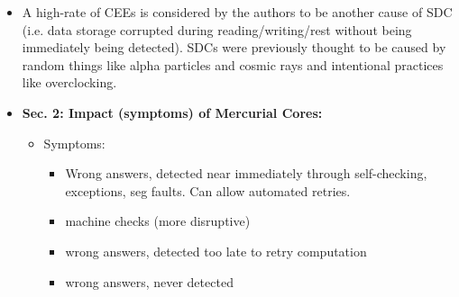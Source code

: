 \documentclass [12pt]{article}
\begin{document}
\begin{itemize}
            \item A high-rate of CEEs is considered by the authors to be another cause of SDC (i.e. data storage corrupted during reading/writing/rest without being immediately being detected). SDCs were previously thought to be caused by random things like alpha particles and cosmic rays and intentional practices like overclocking.
            \item \textbf{Sec. 2: Impact (symptoms) of Mercurial Cores:}
                \begin{itemize}
                    \item Symptoms:
                        \begin{itemize}
                            \item Wrong answers, detected near immediately through self-checking, exceptions, seg faults. Can allow automated retries.
                            \item machine checks (more disruptive)
                            \item wrong answers, detected too late to retry computation
                            \item wrong answers, never detected
                        \end{itemize}


\end{itemize}
\end{itemize}
\end{document}
